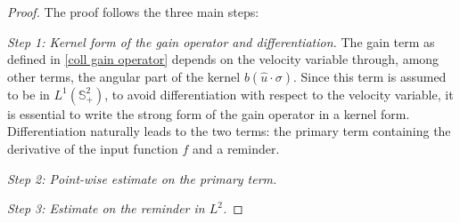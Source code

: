 \documentclass[11pt,a4paper]{amsart}
\newcommand{\bSp}{\mathbb{S}^2_+}
\begin{document}
\begin{proof} The proof follows the three main steps:
	
\emph{Step 1: Kernel form of the gain operator and differentiation.} The gain term as defined in \eqref{coll gain operator} depends on the velocity variable through, among other terms, the angular part of the kernel $b(\hat{u}\cdot\sigma)$. Since this term is assumed to be in $ L^{1}(\bSp)$, to avoid differentiation with respect to the velocity variable, it is essential to write the strong form of the gain operator in a kernel form. Differentiation naturally leads to the two terms: the primary term containing the derivative of the input function $f$ and a reminder.
   
\emph{Step 2: Point-wise estimate on the primary term.} 

\emph{Step 3: Estimate on the reminder in $L^2$.} 
  

\end{proof}
\end{document}
